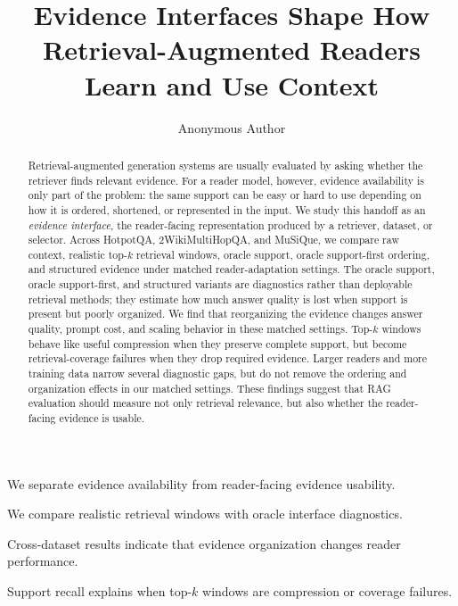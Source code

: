 \documentclass[a4paper,fleqn]{cas-sc}
\begin{document}
\let\WriteBookmarks\relax
\def\floatpagepagefraction{1}
\def\textpagefraction{.001}


\title[mode=title]{Evidence Interfaces Shape How Retrieval-Augmented Readers Learn and Use Context}

\author[1]{Anonymous Author}

\begin{abstract}
Retrieval-augmented generation systems are usually evaluated by asking whether
the retriever finds relevant evidence. For a reader model, however, evidence
availability is only part of the problem: the same support can be easy or hard
to use depending on how it is ordered, shortened, or represented in the input.
We study this handoff as an \emph{evidence interface}, the reader-facing
representation produced by a retriever, dataset, or selector. Across HotpotQA,
2WikiMultiHopQA, and MuSiQue, we compare raw context, realistic top-$k$
retrieval windows, oracle support, oracle support-first ordering, and
structured evidence under matched reader-adaptation settings. The oracle
support, oracle support-first, and structured variants are diagnostics rather
than deployable retrieval methods; they estimate how much answer quality is
lost when support is present but poorly organized. We find that reorganizing
the evidence changes answer quality, prompt cost, and scaling behavior in
these matched settings. Top-$k$ windows behave like useful compression when
they preserve complete support, but become retrieval-coverage failures when
they drop required evidence. Larger readers and more training data narrow
several diagnostic gaps, but do not remove the ordering and organization
effects in our matched settings. These findings suggest that RAG evaluation
should measure not only retrieval relevance, but also whether the reader-facing
evidence is usable.
\end{abstract}

\begin{highlights}
\item We separate evidence availability from reader-facing evidence usability.
\item We compare realistic retrieval windows with oracle interface diagnostics.
\item Cross-dataset results indicate that evidence organization changes reader performance.
\item Support recall explains when top-$k$ windows are compression or coverage failures.
\end{highlights}
\end{document}
